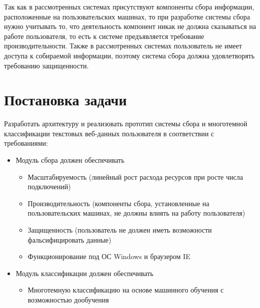\documentclass[russian, utf8, emptystyle]{eskdtext}
\begin{document}
Так как в рассмотренных системах присутствуют компоненты сбора информации, расположенные на пользовательских машинах, то при разработке системы сбора нужно учитывать то, что деятельность компонент никак не должна сказываться на работе пользователя, то есть к системе предъявляется требование производительности. Также в рассмотренных системах пользователь не имеет доступа к собираемой информации, поэтому система сбора должна удовлетворять требованию защищенности.
\section{Постановка задачи}
Разработать архитектуру и реализовать прототип системы сбора и многотемной классификации текстовых веб-данных пользователя в соответствии  с требованиями:
\begin{itemize}
	\item Модуль сбора должен обеспечивать
	\begin{itemize}
		\item Масштабируемость (линейный рост расхода ресурсов при росте числа подключений)
		\item Производительность (компоненты сбора, установленные на пользовательских машинах, не должны влиять на работу пользователя)
		\item Защищенность (пользователь не должен иметь возможности фальсифицировать данные)
		\item Функционирование под ОС Windows и браузером IE 
	\end{itemize}
	\item Модуль классификации должен обеспечивать
		\begin{itemize}
			\item Многотемную классификацию на основе машинного обучения с возможностью дообучения
		\end{itemize}
\end{itemize}
\end{document}
